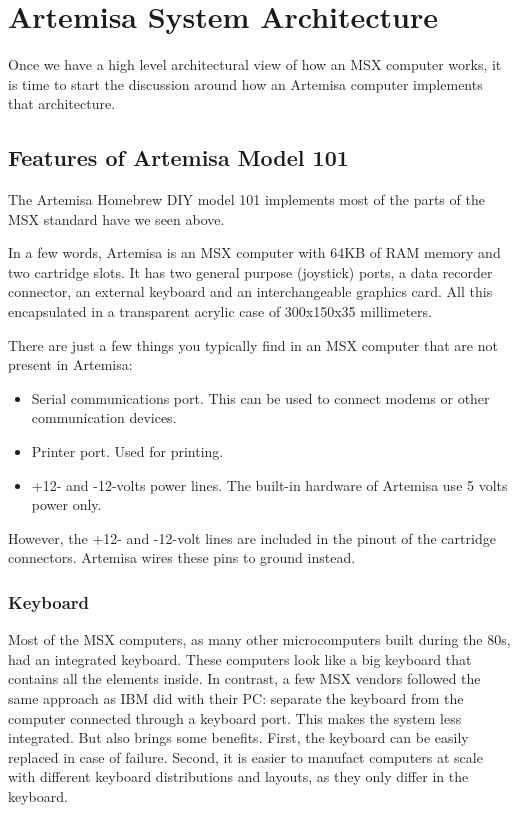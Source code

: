 \chapter{Artemisa System Architecture}

Once we have a high level architectural view of how an MSX computer works, it is time to start the discussion around how an Artemisa computer implements that architecture.

\section{Features of Artemisa Model 101}

The Artemisa Homebrew DIY model 101 implements most of the parts of the MSX standard have we seen above.

In a few words, Artemisa is an MSX computer with 64KB of RAM memory and two cartridge slots. It has two general purpose (joystick) ports, a data recorder connector, an external keyboard and an interchangeable graphics card. All this encapsulated in a transparent acrylic case of 300x150x35 millimeters.

There are just a few things you typically find in an MSX computer that are not present in Artemisa:

\begin{itemize}
  \item Serial communications port. This can be used to connect modems or other communication devices.
  \item Printer port. Used for printing.
  \item +12- and -12-volts power lines. The built-in hardware of Artemisa use 5 volts power only.
\end{itemize}

However, the +12- and -12-volt lines are included in the pinout of the cartridge connectors. Artemisa wires these pins to ground instead.

\subsection{Keyboard}

Most of the MSX computers, as many other microcomputers built during the 80s, had an integrated keyboard. These computers look like a big keyboard that contains all the elements inside. In contrast, a few MSX vendors followed the same approach as IBM did with their PC: separate the keyboard from the computer connected through a keyboard port. This makes the system less integrated. But also brings some benefits. First, the keyboard can be easily replaced in case of failure. Second, it is easier to manufact computers at scale with different keyboard distributions and layouts, as they only differ in the keyboard.

